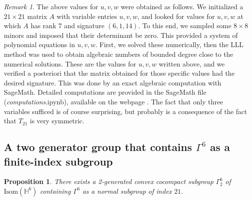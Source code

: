 \documentclass{amsart}
\theoremstyle{plain}
\newtheorem{proposition}[theorem]{Proposition}
\theoremstyle{definition}
\theoremstyle{remark}
\newtheorem{remark}[theorem]{Remark}
\numberwithin{equation}{section}
\newcommand{\hh}{\mathbb H}
\newcommand{\T}{T_{21}}
\begin{document}
\begin{remark}\label{rem:computation}
The above values for  $u,v,w$ were obtained as follows. 
We initialized a $21\times 21$ matrix $A$ with variable entries $u,v,w$, and looked for values for $u,v,w$ at which $A$ has rank $7$ and signature $(6,1,14)$. 
To this end, we sampled some $8\times 8$ minors and imposed that their determinant be zero. 
This provided a system of polynomial equations in $u,v,w$. First, we solved these numerically, then the LLL method was used to obtain algebraic numbers of bounded degree close to the numerical solutions. 
These are the values for $u,v,w$ written above, and we verified a posteriori that the matrix obtained for those specific values had the desired signature.
This was done by an exact algebraic computation  with SageMath. 
Detailed computations are provided in the SageMath file (\emph{computations}.ipynb), available on the webpage \cite{computations}.
The fact that only three variables sufficed is of course surprising, but probably is a consequence of the fact that $\T$ is very symmetric.
\end{remark}


\subsection{A two generator group that contains \texorpdfstring{$\Gamma^6$}{Gamma6}  as a finite-index subgroup}\label{sec:two_generators}

\begin{proposition}\label{main6_2nd_half}
  There exists a 2-generated convex cocompact subgroup $\Gamma_2^6$ of $\mathrm{Isom} (\hh^6)$ containing $\Gamma^6$ as a normal subgroup of index $21$. 
\end{proposition}
\end{document}
